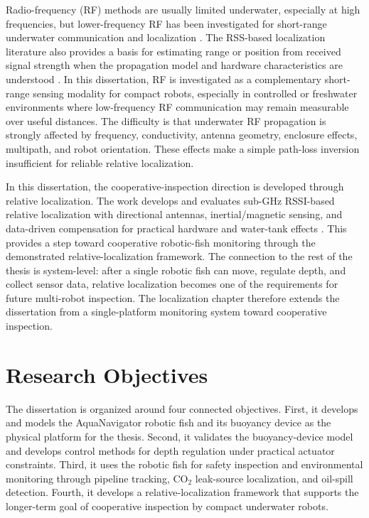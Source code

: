 \documentclass{uhcoethesis}
\begin{document}
Radio-frequency (RF) methods are usually limited underwater, especially at high frequencies, but lower-frequency RF has been investigated for short-range underwater communication and localization \cite{Palmeiro2011,Nguyen2019,Ryecroft2019}. The RSS-based localization literature also provides a basis for estimating range or position from received signal strength when the propagation model and hardware characteristics are understood \cite{Zekavat2019,Nguyen2019}. In this dissertation, RF is investigated as a complementary short-range sensing modality for compact robots, especially in controlled or freshwater environments where low-frequency RF communication may remain measurable over useful distances. The difficulty is that underwater RF propagation is strongly affected by frequency, conductivity, antenna geometry, enclosure effects, multipath, and robot orientation. These effects make a simple path-loss inversion insufficient for reliable relative localization.

In this dissertation, the cooperative-inspection direction is developed through relative localization. The work develops and evaluates sub-GHz RSSI-based relative localization with directional antennas, inertial/magnetic sensing, and data-driven compensation for practical hardware and water-tank effects \cite{Masood2026RSSI,Masood2025Swarm}. This provides a step toward cooperative robotic-fish monitoring through the demonstrated relative-localization framework. The connection to the rest of the thesis is system-level: after a single robotic fish can move, regulate depth, and collect sensor data, relative localization becomes one of the requirements for future multi-robot inspection. The localization chapter therefore extends the dissertation from a single-platform monitoring system toward cooperative inspection.

\section{Research Objectives}

The dissertation is organized around four connected objectives. First, it develops and models the AquaNavigator robotic fish and its buoyancy device as the physical platform for the thesis. Second, it validates the buoyancy-device model and develops control methods for depth regulation under practical actuator constraints. Third, it uses the robotic fish for safety inspection and environmental monitoring through pipeline tracking, \mbox{CO$_2$} leak-source localization, and oil-spill detection. Fourth, it develops a relative-localization framework that supports the longer-term goal of cooperative inspection by compact underwater robots.
\end{document}
